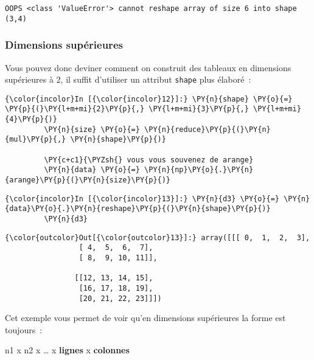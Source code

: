     \begin{Verbatim}[commandchars=\\\{\}]
OOPS <class 'ValueError'> cannot reshape array of size 6 into shape (3,4)

    \end{Verbatim}

    \hypertarget{dimensions-supuxe9rieures}{%
\subsubsection{Dimensions supérieures}\label{dimensions-supuxe9rieures}}

    Vous pouvez donc deviner comment on construit des tableaux en dimensions
supérieures à 2, il suffit d'utiliser un attribut \texttt{shape} plus
élaboré~:

    \begin{Verbatim}[commandchars=\\\{\}]
{\color{incolor}In [{\color{incolor}12}]:} \PY{n}{shape} \PY{o}{=} \PY{p}{(}\PY{l+m+mi}{2}\PY{p}{,} \PY{l+m+mi}{3}\PY{p}{,} \PY{l+m+mi}{4}\PY{p}{)}
         \PY{n}{size} \PY{o}{=} \PY{n}{reduce}\PY{p}{(}\PY{n}{mul}\PY{p}{,} \PY{n}{shape}\PY{p}{)}
         
         \PY{c+c1}{\PYZsh{} vous vous souvenez de arange}
         \PY{n}{data} \PY{o}{=} \PY{n}{np}\PY{o}{.}\PY{n}{arange}\PY{p}{(}\PY{n}{size}\PY{p}{)}
\end{Verbatim}


    \begin{Verbatim}[commandchars=\\\{\}]
{\color{incolor}In [{\color{incolor}13}]:} \PY{n}{d3} \PY{o}{=} \PY{n}{data}\PY{o}{.}\PY{n}{reshape}\PY{p}{(}\PY{n}{shape}\PY{p}{)}
         \PY{n}{d3}
\end{Verbatim}


\begin{Verbatim}[commandchars=\\\{\}]
{\color{outcolor}Out[{\color{outcolor}13}]:} array([[[ 0,  1,  2,  3],
                 [ 4,  5,  6,  7],
                 [ 8,  9, 10, 11]],
         
                [[12, 13, 14, 15],
                 [16, 17, 18, 19],
                 [20, 21, 22, 23]]])
\end{Verbatim}
            
    Cet exemple vous permet de voir qu'en dimensions supérieures la forme
est toujours~:

n1 x n2 x \ldots{} x \textbf{lignes} x \textbf{colonnes}

